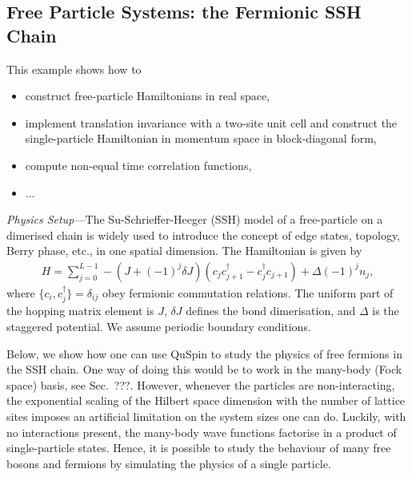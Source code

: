 \documentclass{SciPost}
\newcommand\0{\scalebox{-1}[1]{0}}
\begin{document}
\subsection{Free Particle Systems: the Fermionic SSH Chain}

\label{subsec:SSH_model}

This example shows how to
\begin{itemize}
	\item construct free-particle Hamiltonians in real space,
	\item implement translation invariance with a two-site unit cell and construct the single-particle Hamiltonian in momentum space in block-diagonal form,
	\item compute non-equal time correlation functions,
	\item ...
\end{itemize}

\noindent\emph{Physics Setup---}The Su-Schrieffer-Heeger (SSH) model of a free-particle on a dimerised chain is widely used to introduce the concept of edge states, topology, Berry phase, etc., in one spatial dimension. The Hamiltonian is given by
\begin{eqnarray}
H = \sum_{j=0}^{L-1} -(J+(-1)^j\delta J)\left(c_jc^\dagger_{j+1} - c^\dagger_{j}c_{j+1}\right) + \Delta(-1)^jn_j, 
\label{eq:SSH}
\end{eqnarray}
where $\{c_i,c^\dagger_j\}=\delta _{ij}$ obey fermionic commutation relations. The uniform part of the hopping matrix element is $J$, $\delta J$ defines the bond dimerisation, and $\Delta$ is the staggered potential. We assume periodic boundary conditions.

Below, we show how one can use QuSpin to study the physics of free fermions in the SSH chain. One way of doing this would be to work in the many-body (Fock space) basis, see Sec.~???. However, whenever the particles are non-interacting, the exponential scaling of the Hilbert space dimension with the number of lattice sites imposes an artificial limitation on the system sizes one can do. Luckily, with no interactions present, the many-body wave functions factorise in a product of single-particle states. Hence, it is possible to study the behaviour of many free bosons and fermions by simulating the physics of a single particle.
\end{document}
